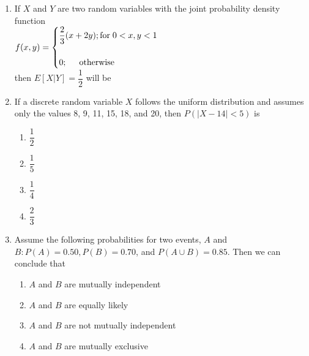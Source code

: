 \documentclass{article}
\begin{document}
\begin{enumerate}[leftmargin=*, start=45, label=Q.\arabic*.]
    \item If $X$ and $Y$ are two random variables with the joint probability density function \\ 
    $f(x,y)=\begin{cases}
        \dfrac{2}{3}(x+2y); \text{for} \hspace{0.1cm} 0<x,y<1 \\ \\
        0; \hspace{0.5cm} \text{otherwise}
    \end{cases}$ \\
    then $E[X|Y]=\dfrac{1}{2}$ will be

    \begin{enumerate}
    \end{enumerate}

    \item If a discrete random variable $X$ follows the uniform distribution and assumes only the values 8, 9, 11, 15, 18, and 20, then $P(|X-14|<5)$ is 

    \begin{multicols}{4}
        \begin{enumerate}
            \item $\dfrac{1}{2}$
            \item $\dfrac{1}{5}$
            \item $\dfrac{1}{4}$
            \item $\dfrac{2}{3}$
        \end{enumerate}
    \end{multicols}

    \item Assume the following probabilities for two events, $A$ and $B: P(A)=0.50, P(B)=0.70$, and $P(A \cup B)=0.85$. Then we can conclude that 

    \begin{multicols}{2}
    \begin{enumerate}
        \item $A$ and $B$ are mutually independent 
        \item $A$ and $B$ are equally likely
        \item $A$ and $B$ are not mutually independent
        \item $A$ and $B$ are mutually exclusive
    \end{enumerate}
    \end{multicols}


\end{enumerate}
\end{document}
